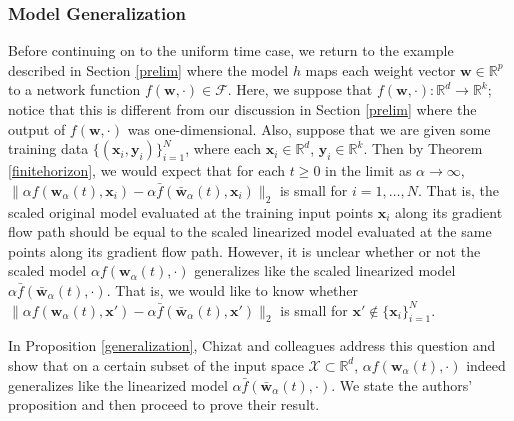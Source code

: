 \documentclass{article}
\begin{document}
\subsubsection{Model Generalization}
Before continuing on to the uniform time case, we return to the example described in Section \ref{prelim} where the model $h$ maps each weight vector $\boldsymbol{w} \in \mathbb{R}^p$ to a network function $f(\boldsymbol{w}, \cdot) \in \mathcal{F}$. Here, we suppose that $f(\boldsymbol{w}, \cdot): \mathbb{R}^d \rightarrow \mathbb{R}^k$; notice that this is different from our discussion in Section \ref{prelim} where the output of $f(\boldsymbol{w}, \cdot)$ was one-dimensional. Also, suppose that we are given some training data $\{(\boldsymbol{x}_i, \boldsymbol{y}_i) \}_{i=1}^N$, where each $\boldsymbol{x}_i \in \mathbb{R}^d$, $\boldsymbol{y}_i \in \mathbb{R}^k$. Then by Theorem \ref{finitehorizon}, we would expect that for each $t \geq 0$ in the limit as $\alpha \rightarrow \infty$, $\| \alpha f(\boldsymbol{w}_{\alpha}(t), \boldsymbol{x}_i) -   \alpha  \bar{f}(\boldsymbol{\bar{w}}_{\alpha}(t), \boldsymbol{x}_i) \|_2$ is small for $i = 1, \ldots, N$. That is, the scaled original model evaluated at the training input points $\boldsymbol{x}_i$ along its gradient flow path should be equal to the scaled linearized model evaluated at the same points along its gradient flow path. However, it is unclear whether or not the scaled model $\alpha f(\boldsymbol{w}_{\alpha}(t), \cdot)$ generalizes like the scaled linearized model $\alpha \bar{f}(\boldsymbol{\bar{w}}_{\alpha}(t), \cdot)$. That is, we would like to know whether $\| \alpha f(\boldsymbol{w}_{\alpha}(t), \boldsymbol{x}') - \alpha  \bar{f}(\boldsymbol{\bar{w}}_{\alpha}(t), \boldsymbol{x}') \|_2$ is small for $\boldsymbol{x}' \notin \{ \boldsymbol{x}_i \}_{i=1}^N$.

In Proposition \ref{generalization}, Chizat and colleagues address this question and show that on a certain subset of the input space $\mathcal{X} \subset \mathbb{R}^d$, $\alpha f(\boldsymbol{w}_{\alpha}(t), \cdot)$ indeed generalizes like the linearized model $\alpha \bar{f}(\boldsymbol{\bar{w}}_{\alpha}(t), \cdot)$. We state the authors' proposition and then proceed to prove their result.
\end{document}

